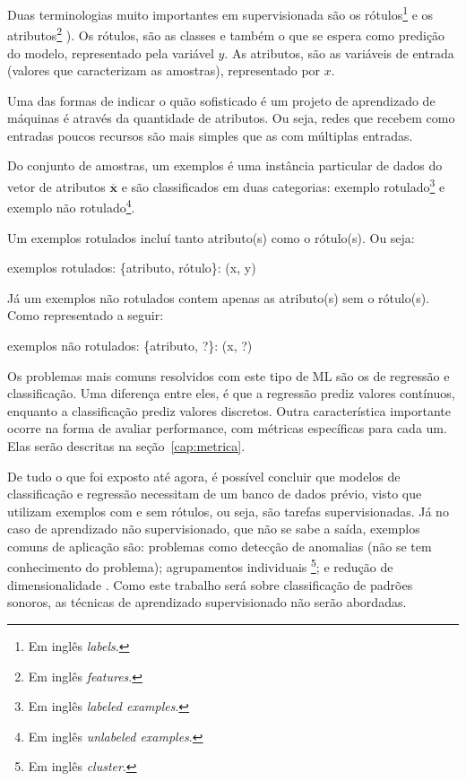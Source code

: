             Duas terminologias muito importantes em \am\textit{ }supervisionada são os rótulos\footnote{Em inglês \textit{labels}.} e os atributos\footnote{Em inglês \textit{features}.} ). Os rótulos, são as classes e também o que se espera como predição do modelo, representado pela variável $y$. As atributos, são as variáveis de entrada (valores que caracterizam as amostras), representado por $x$. 
            
            Uma das formas de indicar o quão sofisticado é um projeto de aprendizado de máquinas é através da quantidade de atributos. Ou seja, redes que recebem como entradas poucos recursos são mais simples que as com múltiplas entradas. 
            
            Do conjunto de amostras, um exemplos é uma instância particular de dados do vetor de atributos $\mathbf{\overline{x}}$ e são classificados em duas categorias: exemplo rotulado\footnote{Em inglês \textit{labeled examples}.} e exemplo não rotulado\footnote{Em inglês \textit{unlabeled examples}.}. 
            
            Um exemplos rotulados incluí tanto atributo(s) como o rótulo(s). Ou seja:
            \begin{center}
                exemplos rotulados: \{atributo, rótulo\}: (x, y)
            \end{center}
    
            Já um exemplos não rotulados contem apenas as atributo(s) sem o rótulo(s). Como representado a seguir:
            \begin{center}
                exemplos não rotulados: \{atributo, ?\}: (x, ?)
            \end{center}
    
            Os problemas mais comuns resolvidos com este tipo de ML são os de regressão e classificação. Uma diferença entre eles, é que a regressão prediz valores contínuos, enquanto a classificação prediz valores discretos. Outra característica importante ocorre na forma de avaliar performance, com métricas específicas para cada um. Elas serão descritas na seção~\ref{cap:metrica}. 
            
            De tudo o que foi exposto até agora, é possível concluir que modelos de classificação e regressão necessitam de um banco de dados prévio, visto que utilizam exemplos com e sem rótulos, ou seja, são tarefas supervisionadas. Já no caso de aprendizado não supervisionado, que não se sabe a saída, exemplos comuns de aplicação são: problemas como detecção de anomalias (não se tem conhecimento do problema); agrupamentos individuais \footnote{Em inglês \textit{cluster}.}; e redução de dimensionalidade \cite{gentleman2008unsupervised}. Como este trabalho será sobre classificação de padrões sonoros, as técnicas de aprendizado supervisionado não serão abordadas.
            

